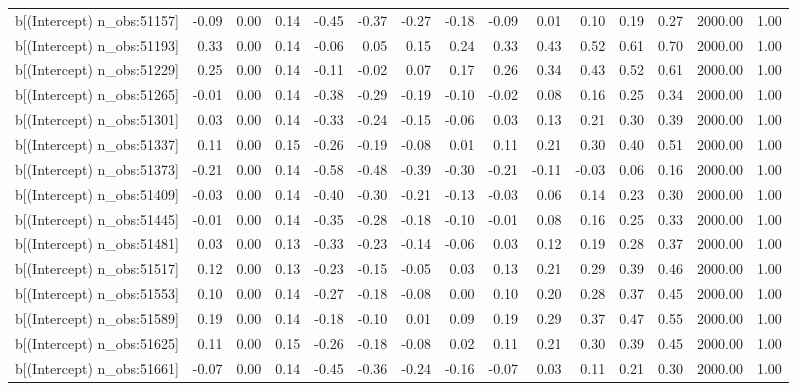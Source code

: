 \begin{table}[ht]
\begin{tabular}{rrrrrrrrrrrrrrr}
  b[(Intercept) n\_obs:51157] & -0.09 & 0.00 & 0.14 & -0.45 & -0.37 & -0.27 & -0.18 & -0.09 & 0.01 & 0.10 & 0.19 & 0.27 & 2000.00 & 1.00 \\ 
  b[(Intercept) n\_obs:51193] & 0.33 & 0.00 & 0.14 & -0.06 & 0.05 & 0.15 & 0.24 & 0.33 & 0.43 & 0.52 & 0.61 & 0.70 & 2000.00 & 1.00 \\ 
  b[(Intercept) n\_obs:51229] & 0.25 & 0.00 & 0.14 & -0.11 & -0.02 & 0.07 & 0.17 & 0.26 & 0.34 & 0.43 & 0.52 & 0.61 & 2000.00 & 1.00 \\ 
  b[(Intercept) n\_obs:51265] & -0.01 & 0.00 & 0.14 & -0.38 & -0.29 & -0.19 & -0.10 & -0.02 & 0.08 & 0.16 & 0.25 & 0.34 & 2000.00 & 1.00 \\ 
  b[(Intercept) n\_obs:51301] & 0.03 & 0.00 & 0.14 & -0.33 & -0.24 & -0.15 & -0.06 & 0.03 & 0.13 & 0.21 & 0.30 & 0.39 & 2000.00 & 1.00 \\ 
  b[(Intercept) n\_obs:51337] & 0.11 & 0.00 & 0.15 & -0.26 & -0.19 & -0.08 & 0.01 & 0.11 & 0.21 & 0.30 & 0.40 & 0.51 & 2000.00 & 1.00 \\ 
  b[(Intercept) n\_obs:51373] & -0.21 & 0.00 & 0.14 & -0.58 & -0.48 & -0.39 & -0.30 & -0.21 & -0.11 & -0.03 & 0.06 & 0.16 & 2000.00 & 1.00 \\ 
  b[(Intercept) n\_obs:51409] & -0.03 & 0.00 & 0.14 & -0.40 & -0.30 & -0.21 & -0.13 & -0.03 & 0.06 & 0.14 & 0.23 & 0.30 & 2000.00 & 1.00 \\ 
  b[(Intercept) n\_obs:51445] & -0.01 & 0.00 & 0.14 & -0.35 & -0.28 & -0.18 & -0.10 & -0.01 & 0.08 & 0.16 & 0.25 & 0.33 & 2000.00 & 1.00 \\ 
  b[(Intercept) n\_obs:51481] & 0.03 & 0.00 & 0.13 & -0.33 & -0.23 & -0.14 & -0.06 & 0.03 & 0.12 & 0.19 & 0.28 & 0.37 & 2000.00 & 1.00 \\ 
  b[(Intercept) n\_obs:51517] & 0.12 & 0.00 & 0.13 & -0.23 & -0.15 & -0.05 & 0.03 & 0.13 & 0.21 & 0.29 & 0.39 & 0.46 & 2000.00 & 1.00 \\ 
  b[(Intercept) n\_obs:51553] & 0.10 & 0.00 & 0.14 & -0.27 & -0.18 & -0.08 & 0.00 & 0.10 & 0.20 & 0.28 & 0.37 & 0.45 & 2000.00 & 1.00 \\ 
  b[(Intercept) n\_obs:51589] & 0.19 & 0.00 & 0.14 & -0.18 & -0.10 & 0.01 & 0.09 & 0.19 & 0.29 & 0.37 & 0.47 & 0.55 & 2000.00 & 1.00 \\ 
  b[(Intercept) n\_obs:51625] & 0.11 & 0.00 & 0.15 & -0.26 & -0.18 & -0.08 & 0.02 & 0.11 & 0.21 & 0.30 & 0.39 & 0.45 & 2000.00 & 1.00 \\ 
  b[(Intercept) n\_obs:51661] & -0.07 & 0.00 & 0.14 & -0.45 & -0.36 & -0.24 & -0.16 & -0.07 & 0.03 & 0.11 & 0.21 & 0.30 & 2000.00 & 1.00 \\ 

\end{tabular}
\end{table}
